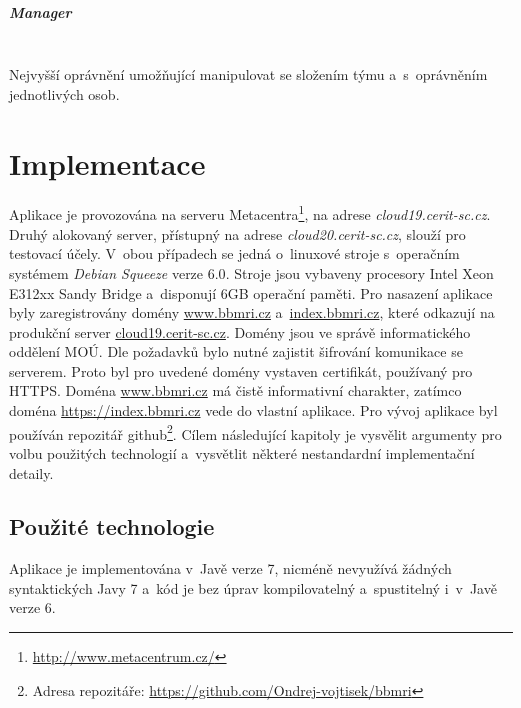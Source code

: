 \documentclass[11pt, draft, oneside]{fithesis2}
\newcommand{\paragraphNewLine}[1]{\paragraph*{#1}\mbox{}\\}
\begin{document}
\paragraphNewLine{Manager}
Nejvyšší oprávnění umožňující manipulovat se složením týmu a~s~oprávněním jednotlivých osob.











\chapter{Implementace}\label{chapter:implementation}
Aplikace je provozována na serveru Metacentra\footnote{\url{http://www.metacentrum.cz/}}, na adrese \textit{cloud19.cerit-sc.cz}. Druhý alokovaný server, přístupný na adrese \textit{cloud20.cerit-sc.cz}, slouží pro testovací účely. V~obou případech se jedná o~linuxové stroje s~operačním systémem \textit{Debian Squeeze} verze $6.0$. Stroje jsou vybaveny procesory Intel Xeon E312xx Sandy Bridge a~disponují 6GB operační paměti.
Pro nasazení aplikace byly zaregistrovány domény \url{www.bbmri.cz} a~\url{index.bbmri.cz}, které odkazují na produkční server \url{cloud19.cerit-sc.cz}. Domény jsou ve správě informatického oddělení MOÚ.
Dle požadavků bylo nutné zajistit šifrování komunikace se serverem. Proto byl pro uvedené domény vystaven certifikát, používaný pro HTTPS. 
Doména \url{www.bbmri.cz} má čistě informativní charakter, zatímco doména \url{https://index.bbmri.cz} vede do vlastní aplikace.
Pro vývoj aplikace byl používán repozitář github\footnote{Adresa repozitáře: \url{https://github.com/Ondrej-vojtisek/bbmri}}. 
Cílem následující kapitoly je vysvělit argumenty pro volbu použitých technologií a~vysvětlit některé nestandardní implementační detaily.


\section{Použité technologie}
Aplikace je implementována v~Javě verze 7, nicméně nevyužívá žádných syntaktických  Javy 7 a~kód je bez úprav kompilovatelný a~spustitelný i~v~Javě verze 6. 
\end{document}
